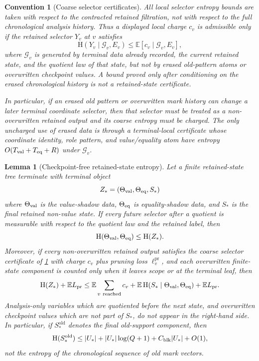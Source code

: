 \documentclass[11pt]{article}
\newcommand{\Cref}[1]{\ref{#1}}
\newtheorem{lemma}[theorem]{Lemma}
\newtheorem{convention}[theorem]{Convention}
\theoremstyle{remark}
\newcommand{\E}{\mathbb E}
\newcommand{\HH}{\mathrm H}
\newcommand{\pr}{\mathrm{pr}}
\newcommand{\old}{\mathrm{old}}
\begin{document}
\begin{convention}[Coarse selector certificates]\label{conv:coarse-selector}
All local selector entropy bounds are taken with respect to the contracted retained filtration, not with respect to the full chronological analysis history.  Thus a displayed local charge $c_v$ is admissible only if the retained selector $Y_v$ at $v$ satisfies
\[
        \HH(Y_v\mid \mathcal G_v,E_v)\le \E[c_v\mid \mathcal G_v,E_v],
\]
where $\mathcal G_v$ is generated by terminal data already recorded, the current retained state, and the quotient law of that state, but not by erased old-pattern atoms or overwritten checkpoint values.  A bound proved only after conditioning on the erased chronological history is not a retained-state certificate.

In particular, if an erased old pattern or overwritten mark history can change a later terminal coordinate selector, then that selector must be treated as a non-overwritten retained output and its coarse entropy must be charged.  The only uncharged use of erased data is through a terminal-local certificate whose coordinate identity, role pattern, and value/equality atom have entropy $O(T_{\rm val}+T_{\rm eq}+R)$ under $\mathcal G_v$.
\end{convention}

\begin{lemma}[Checkpoint-free retained-state entropy]\label{lem:retained-entropy}
Let a finite retained-state tree terminate with terminal object
\[
        Z_*=(\Theta_{\rm val},\Theta_{\rm eq},S_*)
\]
where $\Theta_{\rm val}$ is the value-shadow data, $\Theta_{\rm eq}$ is equality-shadow data, and $S_*$ is the final retained non-value state.  If every future selector after a quotient is measurable with respect to the quotient law and the retained label, then
\[
        \HH(\Theta_{\rm val},\Theta_{\rm eq})\le \HH(Z_*).
\]
Moreover, if every non-overwritten retained output satisfies the coarse selector certificate of \Cref{conv:coarse-selector} with charge $c_v$ plus pruning loss $\ell^{\pr}_v$, and each overwritten finite-state component is counted only when it leaves scope or at the terminal leaf, then
\[
        \HH(Z_*)+\E L_{\pr}
        \le
        \E\sum_{v\ {\rm reached}} c_v
        +\E\,\HH(S_*\mid \Theta_{\rm val},\Theta_{\rm eq})
        +\E L_{\pr}.
\]
Analysis-only variables which are quotiented before the next state, and overwritten checkpoint values which are not part of $S_*$, do not appear in the right-hand side.  In particular, if $S_*^{\old}$ denotes the final old-support component, then
\[
        \HH(S_*^{\old})
        \le |U_*|+|U_*|\log(Q+1)+C_{\rm blk}|U_*|+O(1),
\]
not the entropy of the chronological sequence of old mark vectors.
\end{lemma}
\end{document}
